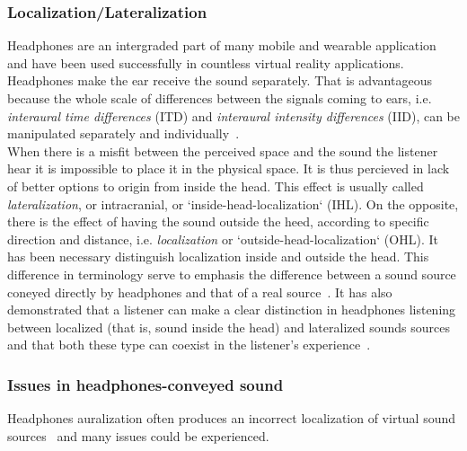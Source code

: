 \documentclass[journal]{IEEEtran}
\begin{document}
\subsubsection{Localization/Lateralization}
Headphones are an intergraded part of many mobile and wearable application and have been used successfully in countless virtual reality applications. Headphones make the ear receive the sound separately. That is advantageous because the whole scale of differences between the signals coming to ears, i.e. \emph{interaural time differences} (ITD) and \emph{interaural intensity differences} (IID), can be manipulated separately and individually~\cite{}.\\
When there is a misfit between the perceived space and the sound the listener hear it is impossible to place it in the physical space. It is thus percieved in lack of better options to origin from inside the head\cite{}. This effect is usually called \emph{lateralization}, or intracranial, or `inside-head-localization` (IHL). On the opposite, there is the effect of having the sound outside the heed, according to specific direction and distance, i.e. \emph{localization} or `outside-head-localization` (OHL).
It has been necessary distinguish localization inside and outside the head. This difference in terminology serve to emphasis the difference between a sound source coneyed directly by headphones and that of a real source~\cite{}. It has also demonstrated that a listener can make a clear distinction in headphones listening between localized (that is, sound inside the head) and lateralized sounds sources and that both these type can coexist in the listener's experience~\cite{}.  

\subsubsection{Issues in headphones-conveyed sound}
Headphones auralization often produces an incorrect localization of virtual sound sources~\cite{} and many issues could be experienced.\\
\end{document}

